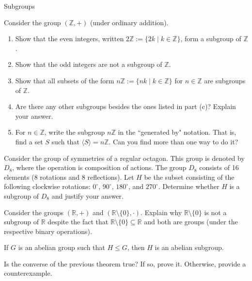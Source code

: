 \begin{section}{Subgroups}
\begin{problem}\label{prob:nZ}
Consider the group $(\mathbb{Z},+)$ (under ordinary addition).
\begin{enumerate}[label=\rm{(\alph*)}]
\item Show that the even integers, written $2\mathbb{Z}:=\{2k\mid k\in\mathbb{Z}\}$, form a subgroup of $\mathbb{Z}$.
\item Show that the odd integers are not a subgroup of $\mathbb{Z}$.
\item Show that all subsets of the form $n\mathbb{Z}:=\{nk\mid k\in\mathbb{Z}\}$ for $n\in\mathbb{Z}$ are subgroups of $\mathbb{Z}$.
\item\label{prob:nZothers} Are there any other subgroups besides the ones listed in part (c)?  Explain your answer.
\item For $n\in \mathbb{Z}$, write the subgroup $n\mathbb{Z}$ in the ``generated by" notation.  That is, find a set $S$ such that $\langle S\rangle =n\mathbb{Z}$.  Can you find more than one way to do it?
\end{enumerate}
\end{problem}

\begin{problem}
Consider the group of symmetries of a regular octagon.  This group is denoted by $D_8$, where the operation is composition of actions.  The group $D_8$ consists of 16 elements (8 rotations and 8 reflections).  Let $H$ be the subset consisting of the following clockwise rotations: $0^\circ$, $90^\circ$, $180^\circ$, and $270^\circ$.  Determine whether $H$ is a subgroup of $D_8$ and justify your answer.
\end{problem}

\begin{problem}
Consider the groups $(\mathbb{R},+)$ and $(\mathbb{R}\setminus\{0\},\cdot)$.  Explain why $\mathbb{R}\setminus\{0\}$ is not a subgroup of $\mathbb{R}$ despite the fact that $\mathbb{R}\setminus\{0\}\subseteq\mathbb{R}$ and both are groups (under the respective binary operations).
\end{problem}

\begin{theorem}
If $G$ is an abelian group such that $H\leq G$, then $H$ is an abelian subgroup.
\end{theorem}

\begin{problem}
Is the converse of the previous theorem true?  If so, prove it.  Otherwise, provide a counterexample.
\end{problem}


\end{section}
